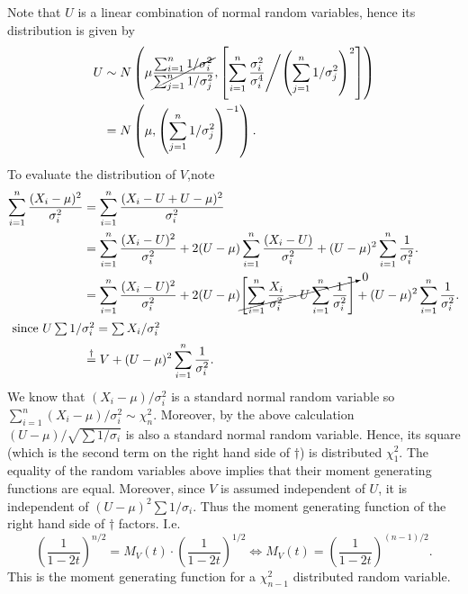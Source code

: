 \documentclass{stat_homework}
\begin{document}
\begin{solution}
  Note that $U$ is a linear combination of normal random variables, hence its distribution is given by 
  \begin{align*}
    U&\sim N\left( \mu\cancel{\frac{\sum_{i=1}^n 1/\sigma_i^2}{\sum_{j=1}^n 1/\sigma_j^2}},\left[ \sum_{i=1}^n \frac{\sigma_i^2}{\sigma_i^4} \middle/ \left(\sum_{j=1}^n 1/\sigma_j^2 \right)^2 \right] \right) \\
    &= N\left( \mu ,\left( \sum_{j=1}^n 1/\sigma_j^2 \right)^{-1}  \right).
  \end{align*}
  To evaluate the distribution of $V$,note 
  \begin{align*}
  \sum_{i=1}^n\frac{(X_i-\mu)^2}{\sigma_i^2}
    &= \sum_{i=1}^n\frac{(X_i - U + U - \mu)^2}{\sigma_i^2}\\
    &= \sum_{i=1}^n\frac{(X_i - U)^2}{\sigma_i^2} + 2(U - \mu)\sum_{i=1}^n\frac{(X_i - U)}{\sigma_i^2} + (U - \mu)^2\sum_{i=1}^n \frac{1}{\sigma_i^2}. \\
    &= \sum_{i=1}^n\frac{(X_i - U)^2}{\sigma_i^2} + 2(U - \mu)\cancelto{0}{\left[\sum_{i=1}^n\frac{X_i}{\sigma_i^2} - U\sum_{i=1}^n\frac{1}{\sigma_i^2}\right]} + (U - \mu)^2\sum_{i=1}^n \frac{1}{\sigma_i^2}. \\
\intertext{ since $U \sum{1/\sigma_i^2} = \sum X_i/\sigma_i^2$}
    &\stackrel{\dagger}{=} V + (U - \mu)^2\sum_{i=1}^n \frac{1}{\sigma_i^2}. \\
\end{align*}
We know that $(X_i-\mu)/\sigma_i^2$ is a standard normal random variable so $\sum_{i=1}^n(X_i-\mu)/\sigma_i^2\sim \chi^2_n$.  Moreover, by the above calculation $(U-\mu)/\sqrt{\sum 1/\sigma_i}$ is also a standard normal random variable. Hence, its square (which is the second term on the right hand side of $\dagger$)  is distributed $\chi^2_1$.  The equality of the random variables above implies that their moment generating functions are equal.  Moreover, since $V$ is assumed independent of $U$, it is independent of $(U- \mu)^2\sum1/\sigma_i$.  Thus the moment generating function of the right hand side of $\dagger$ factors. I.e.
{\small
$$
  \left(\frac{1}{1-2t}\right)^{n/2} = M_V(t) \cdot \left(\frac{1}{1-2t}\right)^{1/2} \iff
  M_V(t) = \left(\frac{1}{1-2t} \right)^{(n-1)/2}.
$$
}
This is the moment generating function for a $\chi^2_{n-1}$ distributed random variable.
\end{solution}
\newpage
\end{document}
